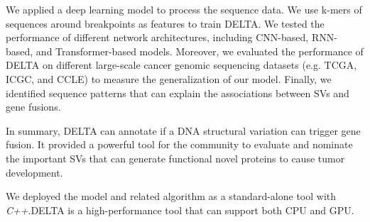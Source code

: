 \documentclass{article}
\begin{document}
We applied a deep learning model to process the sequence data. We use k-mers of sequences around breakpoints as features to train DELTA\@.
We tested the performance of different network architectures, including CNN-based, RNN-based, and Transformer-based models.
Moreover, we evaluated the performance of DELTA on different large-scale cancer genomic sequencing datasets (e.g. TCGA, ICGC, and CCLE) to measure the generalization of our model.
Finally, we identified sequence patterns that can explain the associations between SVs and gene fusions.

In summary, DELTA can annotate if a DNA structural variation can trigger gene fusion.
It provided a powerful tool for the community to evaluate and nominate the important SVs that can generate functional novel proteins to cause tumor development. 

We deployed the model and related algorithm as a standard-alone tool with \textit{C++}.DELTA is a high-performance tool that can support both CPU and GPU\@.






% 
% 
\end{document}
